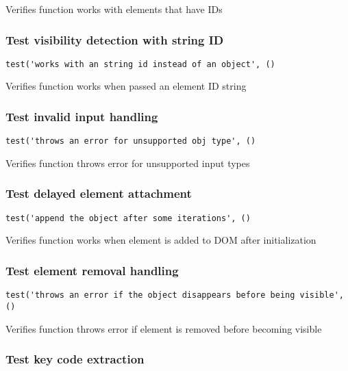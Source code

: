 \documentclass[a4paper]{article}
\begin{document}
Verifies function works with elements that have IDs

\hypertarget{toc497}{}
\subsubsection{Test visibility detection with string ID}

\begin{lstlisting}
test('works with an string id instead of an object', ()
\end{lstlisting}

Verifies function works when passed an element ID string

\hypertarget{toc498}{}
\subsubsection{Test invalid input handling}

\begin{lstlisting}
test('throws an error for unsupported obj type', ()
\end{lstlisting}

Verifies function throws error for unsupported input types

\hypertarget{toc499}{}
\subsubsection{Test delayed element attachment}

\begin{lstlisting}
test('append the object after some iterations', ()
\end{lstlisting}

Verifies function works when element is added to DOM after initialization

\hypertarget{toc500}{}
\subsubsection{Test element removal handling}

\begin{lstlisting}
test('throws an error if the object disappears before being visible', ()
\end{lstlisting}

Verifies function throws error if element is removed before becoming visible

\hypertarget{toc501}{}
\subsubsection{Test key code extraction}
\end{document}
